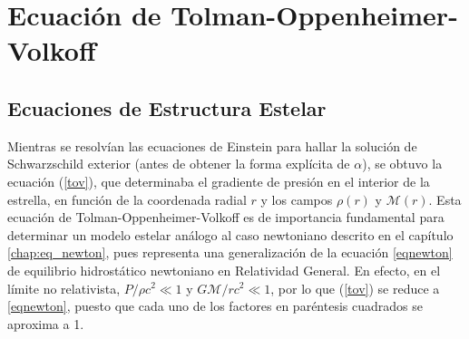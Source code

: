 \section{Ecuación de Tolman-Oppenheimer-Volkoff}

\subsection{Ecuaciones de Estructura Estelar}\label{ecs-estructura-estelar}
Mientras se resolvían las ecuaciones de Einstein para hallar la solución de Schwarzschild exterior (antes de obtener la forma explícita de $\alpha$), se obtuvo la ecuación (\ref{tov}), que determinaba el gradiente de presión en el interior de la estrella, en función de la coordenada radial $r$ y los campos $\rho(r)$ y $\mathcal{M}(r)$. Esta ecuación de Tolman-Oppenheimer-Volkoff es de importancia fundamental para determinar un modelo estelar análogo al caso newtoniano descrito en el capítulo \ref{chap:eq_newton}, pues representa una generalización de la ecuación \eqref{eqnewton} de equilibrio hidrostático newtoniano en Relatividad General. En efecto, en el límite no relativista, $P/\rho c^2\ll1$ y $G\mathcal{M}/rc^2\ll1$, por lo que (\ref{tov}) se reduce a \eqref{eqnewton}, puesto que cada uno de los factores en paréntesis cuadrados se aproxima a 1.

